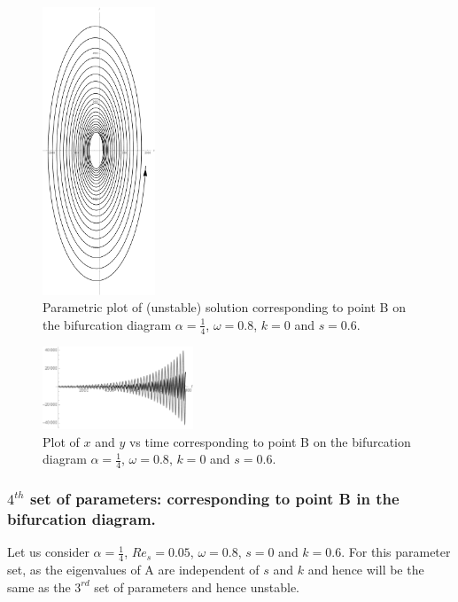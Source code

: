 \documentclass[pdflatex,sn-mathphys]{sn-jnl}%
\theoremstyle{thmstyleone}%
\theoremstyle{thmstyletwo}%
\theoremstyle{thmstylethree}%
\begin{document}
\begin{figure}[h]%
\centering
\includegraphics[width=0.3\textwidth]{Fig3left(unstable)Parametric}
    \caption{Parametric plot of (unstable) solution corresponding to point B on the bifurcation diagram  $\alpha = \frac{1}{4}$, $\omega = 0.8$, $k=0$ and $s=0.6$.}
    \label{fig: Unstable parametric case corresponding to point B on bifurcation diagram}
\end{figure}
\begin{figure}[h]%
\centering
\includegraphics[width=0.4\textwidth]{Fig3left(unstable)plot}
    \caption{Plot of $x$ and $y$ vs time corresponding to point B on the bifurcation diagram $\alpha = \frac{1}{4}$, $\omega = 0.8$, $k=0$ and $s=0.6$.}
        \label{fig: Unstable case corresponding to point B on bifurcation diagram}
\end{figure}



\subsubsection{$4^{th}$ set of parameters: corresponding to point B in the bifurcation diagram.} \label{$4^{th}$ set}

Let us consider $\alpha = \frac{1}{4}$, $Re_{s}=0.05$,  $\omega=0.8$, $s=0$ and $k=0.6$. For this parameter set,  as the eigenvalues of A are independent of $s$ and $k$ and hence will be the same as the $3^{rd}$ set of parameters and hence unstable.
\end{document}

